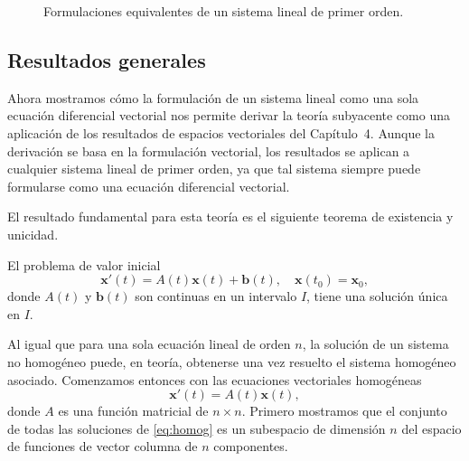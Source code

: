 \begin{figure}[H]
\centering
{}
\caption{Formulaciones equivalentes de un sistema lineal de primer orden.}
\label{fig:formulaciones}
\end{figure}

\subsection{Resultados generales}
Ahora mostramos c\'omo la formulaci\'on de un sistema lineal como una sola ecuaci\'on diferencial vectorial nos permite derivar la teor\'ia subyacente como una aplicaci\'on de los resultados de espacios vectoriales del Cap\'itulo~4. Aunque la derivaci\'on se basa en la formulaci\'on vectorial, los resultados se aplican a cualquier sistema lineal de primer orden, ya que tal sistema siempre puede formularse como una ecuaci\'on diferencial vectorial.

El resultado fundamental para esta teor\'ia es el siguiente teorema de existencia y unicidad.

\begin{theorem}\label{thm:exist-unic}
El problema de valor inicial
\[
\mathbf{x}'(t) = A(t)\mathbf{x}(t) + \mathbf{b}(t), \quad \mathbf{x}(t_0) = \mathbf{x}_0,
\]
donde $A(t)$ y $\mathbf{b}(t)$ son continuas en un intervalo $I$, tiene una soluci\'on \'unica en $I$.
\end{theorem}

Al igual que para una sola ecuaci\'on lineal de orden $n$, la soluci\'on de un sistema no homog\'eneo puede, en teor\'ia, obtenerse una vez resuelto el sistema homog\'eneo asociado. Comenzamos entonces con las ecuaciones vectoriales homog\'eneas
\begin{equation}\label{eq:homog}
    \mathbf{x}'(t) = A(t)\mathbf{x}(t),
\end{equation}
donde $A$ es una funci\'on matricial de $n \times n$. Primero mostramos que el conjunto de todas las soluciones de \eqref{eq:homog} es un subespacio de dimensi\'on $n$ del espacio de funciones de vector columna de $n$ componentes.


